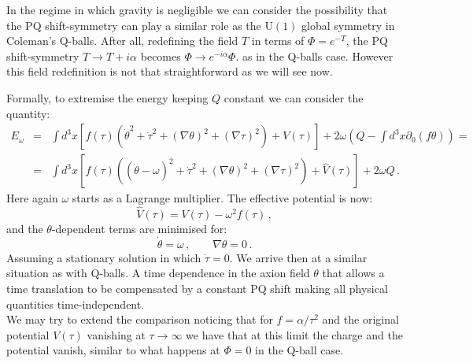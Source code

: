 \documentclass[11pt,a4paper]{article}
\newcommand{\bea}{\begin{eqnarray}}
\newcommand{\eea}{\end{eqnarray}}
\newcommand{\be}{\begin{equation}}
\newcommand{\ee}{\end{equation}}
\begin{document}
In the regime in which gravity is negligible we can consider the possibility that the PQ shift-symmetry can play a similar role as the U$(1)$ global symmetry in Coleman's Q-balls. After all, redefining the field $T$ in terms of $\Phi=e^{-T}$, the PQ shift-symmetry $T\to T+i\alpha$ becomes $\Phi\to e^{-i\alpha}\Phi$. as in the Q-balls case. However this field redefinition is not that straightforward as we will see now.

Formally, to extremise the energy keeping $Q$ constant we can consider the quantity:
 \bea
 E_\omega & = & \int d^3x\left[ f(\tau)\left( \dot{\theta}^2 + \dot{\tau}^2 + (\nabla\theta)^2+(\nabla\tau)^2\right) + V(\tau)\right] + 2 \omega\left(Q-\int d^3x \partial_0(f\theta)\right) = \nonumber \\
 & = &  \int d^3x\left[ f(\tau)\left( (\dot{\theta}-\omega)^2 + \dot{\tau}^2 + (\nabla\theta)^2+(\nabla\tau)^2\right) + \hat{V}(\tau) \right] + 2\omega Q \,.
 \eea
Here again $\omega$ starts as a Lagrange multiplier. The effective potential is now:
\be
\label{eq:Vhat}
\hat{V}(\tau)=V(\tau) -\omega^2 f(\tau) \,,
\ee
and the $\theta$-dependent terms are   minimised for:
\be
\dot{\theta}=\omega\,,  \qquad \nabla{\theta}=0\,.
\ee
Assuming a stationary solution in which $\dot{\tau}=0$. We arrive then at a similar situation as with Q-balls. A time dependence in the axion field $\theta$ that allows a time translation to be compensated by a constant PQ shift making all physical quantities time-independent.\\

We may try to extend the comparison noticing that for $f=\alpha/\tau^2$ and the original potential $V(\tau)$ vanishing at $\tau\to\infty$ we have that at this limit the charge and the potential vanish, similar to what happens at $\Phi=0$ in the Q-ball case.
 
\end{document}
